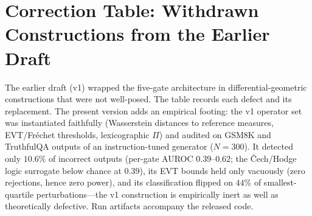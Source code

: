 \section{Correction Table: Withdrawn Constructions from the Earlier Draft}
\label{app:correction}

The earlier draft (v1) wrapped the five-gate architecture in
differential-geometric constructions that were not well-posed. The table
records each defect and its replacement. The present version adds an
empirical footing: the v1 operator set was
instantiated faithfully (Wasserstein distances to reference measures,
EVT/Fr\'echet thresholds, lexicographic $\Pi$) and audited on GSM8K and
TruthfulQA outputs of an instruction-tuned generator ($N=300$). It detected
only $10.6\%$ of incorrect outputs (per-gate AUROC $0.39$--$0.62$; the
\v{C}ech/Hodge logic surrogate below chance at $0.39$), its EVT bounds held
only vacuously (zero rejections, hence zero power), and its classification
flipped on $44\%$ of smallest-quartile perturbations---the v1 construction is
empirically inert as well as theoretically defective. Run artifacts accompany
the released code.


